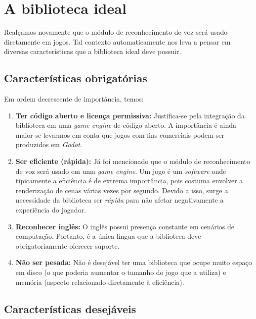 \section{A biblioteca ideal}
\label{idealLibrary}

Realçamos novamente que o módulo de reconhecimento de voz será usado diretamente em jogos. Tal contexto automaticamente nos leva a pensar em diversas características que a biblioteca ideal deve possuir.


\subsection{Características obrigatórias}

Em ordem decrescente de importância, temos:

\begin{enumerate}
\item \textbf{Ter código aberto e licença permissiva:} Justifica-se pela integração da biblioteca em uma \textit{game engine} de código aberto. A importância é ainda maior se levarmos em conta que jogos com fins comerciais podem ser produzidos em \textit{Godot}.

\item \textbf{Ser eficiente (rápida):} Já foi mencionado que o módulo de reconhecimento de voz será usado em uma \textit{game engine}. Um jogo é um \textit{software} onde tipicamente a eficiência é de extrema importância, pois costuma envolver a renderização de cenas várias vezes por segundo. Devido a isso, surge a necessidade da biblioteca ser \emph{rápida} para não afetar negativamente a experiência do jogador.

\item \textbf{Reconhecer inglês:} O inglês possui presença constante em cenários de computação. Portanto, é a única língua que a biblioteca deve obrigatoriamente oferecer suporte.

\item \textbf{Não ser pesada:} Não é desejável ter uma biblioteca que ocupe muito espaço em disco (o que poderia aumentar o tamanho do jogo que a utiliza) e memória (aspecto relacionado diretamente à eficiência).
\end{enumerate}


\subsection{Características desejáveis}

